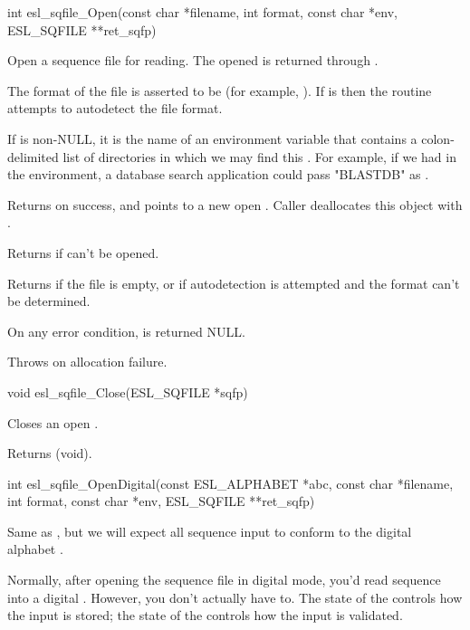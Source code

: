 \begin{sreapi}
\hypertarget{func:esl_sqfile_Open()}
{\item[int esl\_sqfile\_Open(const char *filename, int format, const char *env, ESL\_SQFILE **ret\_sqfp)]}

Open a sequence file  for reading. 
The opened  is returned through .

The format of the file is asserted to be  (for
example, ). If  is
 then the routine attempts to
autodetect the file format.

If  is non-NULL, it is the name of an environment
variable that contains a colon-delimited list of
directories in which we may find this .
For example, if we had 
in the environment, a database search application
could pass "BLASTDB" as .

Returns  on success, and  points to a new
open . Caller deallocates this object with
. 

Returns  if  can't be opened.

Returns  if the file is empty, or
if autodetection is attempted and the format can't be
determined.  

On any error condition,  is returned NULL.

Throws  on allocation failure.


\hypertarget{func:esl_sqfile_Close()}
{\item[void esl\_sqfile\_Close(ESL\_SQFILE *sqfp)]}

Closes an open .

Returns (void).


\hypertarget{func:esl_sqfile_OpenDigital()}
{\item[int esl\_sqfile\_OpenDigital(const ESL\_ALPHABET *abc, const char *filename, int format, const char *env, ESL\_SQFILE **ret\_sqfp)]}

Same as , but we will expect all
sequence input to conform to the digital alphabet .

Normally, after opening the sequence file in digital
mode, you'd read sequence into a digital .
However, you don't actually have to. The state of the
 controls how the input is stored; the state of
the  controls how the input is validated.


\end{sreapi}
